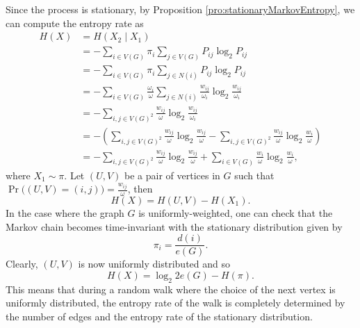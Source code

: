 \documentclass[math]{amznotes}
\theoremstyle{remark}
\begin{document}
Since the process is stationary, by Proposition \ref{pro:stationaryMarkovEntropy}, we can compute the entropy rate as 
\begin{align*}
    H\left(X\right) & = H\left(X_2 \mid X_1\right) \\
    & = -\sum_{i \in V\left(G\right)}\pi_i\sum_{j \in V\left(G\right)}P_{ij}\log_2P_{ij} \\
    & = -\sum_{i \in V\left(G\right)}\pi_i\sum_{j \in N\left(i\right)}P_{ij}\log_2P_{ij} \\
    & = -\sum_{i \in V\left(G\right)}\frac{\omega_i}{\omega}\sum_{j \in N\left(i\right)}\frac{w_{ij}}{\omega_i}\log_2\frac{w_{ij}}{\omega_i} \\
    & = -\sum_{i, j \in V\left(G\right)^2}\frac{w_{ij}}{\omega}\log_2\frac{w_{ij}}{\omega_i} \\
    & = -\left(\sum_{i, j \in V\left(G\right)^2}\frac{w_{ij}}{\omega}\log_2\frac{w_{ij}}{\omega} - \sum_{i, j \in V\left(G\right)^2}\frac{w_{ij}}{\omega}\log_2\frac{w_{i}}{\omega}\right) \\
    & = -\sum_{i, j \in V\left(G\right)^2}\frac{w_{ij}}{\omega}\log_2\frac{w_{ij}}{\omega} + \sum_{i \in V\left(G\right)}\frac{w_{i}}{\omega}\log_2\frac{w_{i}}{\omega},
\end{align*}
where $X_1 \sim \pi$. Let $\left(U, V\right)$ be a pair of vertices in $G$ such that $\Pr\bigl(\left(U, V\right) = \left(i, j\right)\bigr) = \frac{w_{ij}}{\omega}$, then 
\begin{equation*}
    H\left(X\right) = H\left(U, V\right) - H\left(X_1\right).
\end{equation*}
In the case where the graph $G$ is uniformly-weighted, one can check that the Markov chain becomes time-invariant with the stationary distribution given by 
\begin{equation*}
    \pi_i = \frac{d\left(i\right)}{e\left(G\right)}.
\end{equation*}
Clearly, $\left(U, V\right)$ is now uniformly distributed and so 
\begin{equation*}
    H\left(X\right) = \log_2{2e\left(G\right)} - H\left(\pi\right).
\end{equation*}
This means that during a random walk where the choice of the next vertex is uniformly distributed, the entropy rate of the walk is completely determined by the number of edges and the entropy rate of the stationary distribution.
\end{document}
